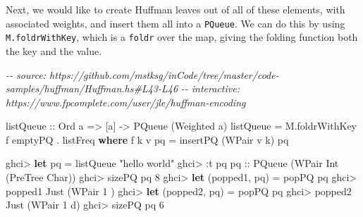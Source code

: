 \documentclass[]{article}
\newenvironment{Shaded}{}{}
\newcommand{\CharTok}[1]{\textcolor[rgb]{0.25,0.44,0.63}{#1}}
\newcommand{\CommentTok}[1]{\textcolor[rgb]{0.38,0.63,0.69}{\textit{#1}}}
\newcommand{\DataTypeTok}[1]{\textcolor[rgb]{0.56,0.13,0.00}{#1}}
\newcommand{\DecValTok}[1]{\textcolor[rgb]{0.25,0.63,0.44}{#1}}
\newcommand{\KeywordTok}[1]{\textcolor[rgb]{0.00,0.44,0.13}{\textbf{#1}}}
\newcommand{\NormalTok}[1]{#1}
\newcommand{\OperatorTok}[1]{\textcolor[rgb]{0.40,0.40,0.40}{#1}}
\newcommand{\OtherTok}[1]{\textcolor[rgb]{0.00,0.44,0.13}{#1}}
\newcommand{\StringTok}[1]{\textcolor[rgb]{0.25,0.44,0.63}{#1}}
\begin{document}
Next, we would like to create Huffman leaves out of all of these elements, with
associated weights, and insert them all into a \texttt{PQueue}. We can do this
by using \texttt{M.foldrWithKey}, which is a \texttt{foldr} over the map, giving
the folding function both the key and the value.

\begin{Shaded}
\begin{Highlighting}[]
\CommentTok{{-}{-} source: https://github.com/mstksg/inCode/tree/master/code{-}samples/huffman/Huffman.hs\#L43{-}L46}
\CommentTok{{-}{-} interactive: https://www.fpcomplete.com/user/jle/huffman{-}encoding}

\OtherTok{listQueue ::} \DataTypeTok{Ord}\NormalTok{ a }\OtherTok{=>}\NormalTok{ [a] }\OtherTok{{-}>} \DataTypeTok{PQueue}\NormalTok{ (}\DataTypeTok{Weighted}\NormalTok{ a)}
\NormalTok{listQueue }\OtherTok{=}\NormalTok{ M.foldrWithKey f emptyPQ }\OperatorTok{.}\NormalTok{ listFreq}
  \KeywordTok{where}
\NormalTok{    f k v pq }\OtherTok{=}\NormalTok{ insertPQ (}\DataTypeTok{WPair}\NormalTok{ v k) pq}
\end{Highlighting}
\end{Shaded}

\begin{Shaded}
\begin{Highlighting}[]
\NormalTok{ghci}\OperatorTok{>} \KeywordTok{let}\NormalTok{ pq }\OtherTok{=}\NormalTok{ listQueue }\StringTok{"hello world"}
\NormalTok{ghci}\OperatorTok{>} \OperatorTok{:}\NormalTok{t pq}
\OtherTok{pq ::} \DataTypeTok{PQueue}\NormalTok{ (}\DataTypeTok{WPair} \DataTypeTok{Int}\NormalTok{ (}\DataTypeTok{PreTree} \DataTypeTok{Char}\NormalTok{))}
\NormalTok{ghci}\OperatorTok{>}\NormalTok{ sizePQ pq}
\DecValTok{8}
\NormalTok{ghci}\OperatorTok{>} \KeywordTok{let}\NormalTok{ (popped1, pq\textquotesingle{}) }\OtherTok{=}\NormalTok{ popPQ pq}
\NormalTok{ghci}\OperatorTok{>}\NormalTok{ popped1}
\DataTypeTok{Just}\NormalTok{ (}\DataTypeTok{WPair} \DecValTok{1} \CharTok{\textquotesingle{} \textquotesingle{}}\NormalTok{)}
\NormalTok{ghci}\OperatorTok{>} \KeywordTok{let}\NormalTok{ (popped2, pq\textquotesingle{}\textquotesingle{}) }\OtherTok{=}\NormalTok{ popPQ pq\textquotesingle{}}
\NormalTok{ghci}\OperatorTok{>}\NormalTok{ popped2}
\DataTypeTok{Just}\NormalTok{ (}\DataTypeTok{WPair} \DecValTok{1} \CharTok{\textquotesingle{}d\textquotesingle{}}\NormalTok{)}
\NormalTok{ghci}\OperatorTok{>}\NormalTok{ sizePQ pq\textquotesingle{}\textquotesingle{}}
\DecValTok{6}
\end{Highlighting}
\end{Shaded}
\end{document}
